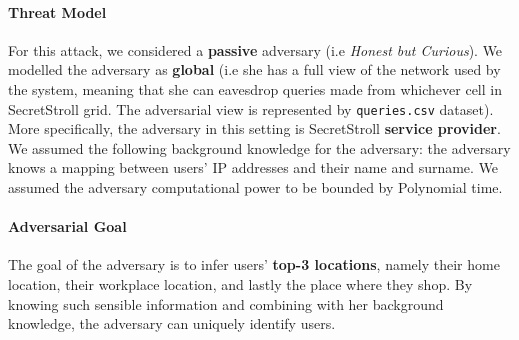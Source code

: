\documentclass[10pt,conference,compsocconf]{IEEEtran}
\begin{document}
\paragraph{Threat Model}
For this attack, we considered a \textbf{passive} adversary (i.e \textit{Honest
but Curious}). We modelled the adversary as \textbf{global} (i.e she has a full
view of the network used by the system, meaning that she can eavesdrop queries
made from whichever cell in SecretStroll grid. The adversarial view is
represented by \texttt{queries.csv} dataset). More specifically, the adversary
in this setting is SecretStroll \textbf{service provider}.\newline
We assumed the following background knowledge for the adversary: the adversary
knows a mapping between users' IP addresses and their name and surname.\newline
We assumed the adversary computational power to be bounded by Polynomial time.


\paragraph{Adversarial Goal}
The goal of the adversary is to infer users' \textbf{top-3 locations}, namely
their home location, their workplace location, and lastly the place where they shop. By knowing such sensible information and
combining with her background knowledge, the adversary can uniquely identify
users.
\end{document}
